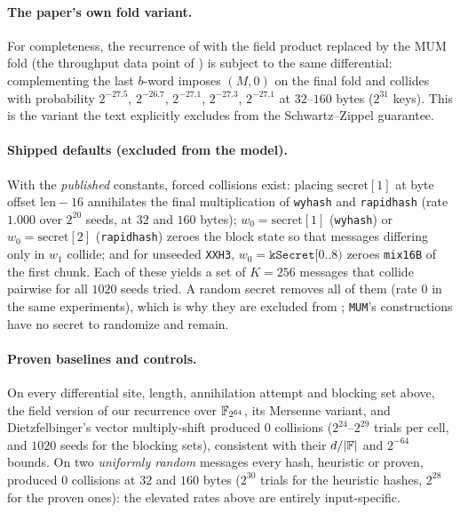 \paragraph{The paper's own fold variant.}
For completeness, the recurrence of  with the field product
replaced by the MUM fold (the throughput data point of
) is subject to the same differential:
complementing the last $b$-word imposes $(M,0)$ on the final fold and collides
with probability $2^{-27.5}$, $2^{-26.7}$, $2^{-27.1}$, $2^{-27.3}$,
$2^{-27.1}$ at $32$--$160$ bytes ($2^{31}$ keys).  This is the variant the text
explicitly excludes from the Schwartz--Zippel guarantee.

\paragraph{Shipped defaults (excluded from the model).}
With the \emph{published} constants, forced collisions exist: placing
$\mathrm{secret}[1]$ at byte offset $\mathrm{len}-16$ annihilates the final
multiplication of \texttt{wyhash} and \texttt{rapidhash} (rate $1.000$ over
$2^{20}$ seeds, at $32$ and $160$ bytes); $w_0=\mathrm{secret}[1]$
(\texttt{wyhash}) or $w_0=\mathrm{secret}[2]$ (\texttt{rapidhash}) zeroes the
block state so that messages differing only in $w_1$ collide; and for
unseeded \texttt{XXH3}, $w_0=\texttt{kSecret}[0..8)$ zeroes
\texttt{mix16B} of the first chunk.  Each of these yields a set of $K=256$
messages that collide pairwise for all $1020$ seeds tried.  A random secret
removes all of them (rate $0$ in the same experiments), which is why they are
excluded from ; \texttt{MUM}'s constructions
have no secret to randomize and remain.

\paragraph{Proven baselines and controls.}
On every differential site, length, annihilation attempt and blocking set
above, the field version of our recurrence over $\mathbb{F}_{2^{64}}$, its Mersenne
variant, and Dietzfelbinger's vector multiply-shift produced $0$ collisions
($2^{24}$--$2^{29}$ trials per cell, and $1020$ seeds for the blocking sets), consistent with their $d/|\mathbb{F}|$ and
$2^{-64}$ bounds.  On two \emph{uniformly random} messages every hash,
heuristic or proven, produced $0$ collisions at $32$ and $160$ bytes
($2^{30}$ trials for the heuristic hashes, $2^{28}$ for the proven ones): the
elevated rates above are entirely input-specific.

